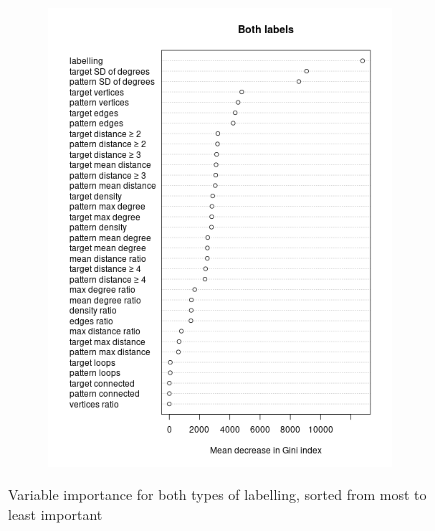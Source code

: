 \documentclass{l4proj}
\theoremstyle{definition}
\theoremstyle{remark}
\begin{document}
\begin{figure}
\begin{subfigure}[t]{0.49\textwidth}
    \includegraphics[width=\textwidth]{images/both_labels_variable_importance.png}
  \end{subfigure}
  \caption{Variable importance for both types of labelling, sorted from most to
    least important}
  \label{fig:variable_importance}
\end{figure}
\end{document}
